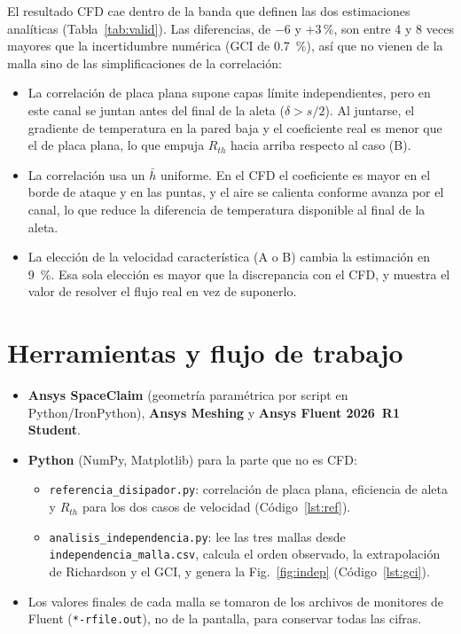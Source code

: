 \documentclass[11pt,letterpaper]{article}
\begin{document}
El resultado CFD cae dentro de la banda que definen las dos estimaciones analíticas (Tabla~\ref{tab:valid}). Las diferencias, de $-6$ y $+3\,\%$, son entre 4 y 8 veces mayores que la incertidumbre numérica (GCI de \SI{0.7}{\%}), así que no vienen de la malla sino de las simplificaciones de la correlación:
\begin{itemize}
\item La correlación de placa plana supone capas límite independientes, pero en este canal se juntan antes del final de la aleta ($\delta>s/2$). Al juntarse, el gradiente de temperatura en la pared baja y el coeficiente real es menor que el de placa plana, lo que empuja $R_{th}$ hacia arriba respecto al caso (B).
\item La correlación usa un $\bar h$ uniforme. En el CFD el coeficiente es mayor en el borde de ataque y en las puntas, y el aire se calienta conforme avanza por el canal, lo que reduce la diferencia de temperatura disponible al final de la aleta.
\item La elección de la velocidad característica (A o B) cambia la estimación en \SI{9}{\%}. Esa sola elección es mayor que la discrepancia con el CFD, y muestra el valor de resolver el flujo real en vez de suponerlo.
\end{itemize}

\section{Herramientas y flujo de trabajo}
\begin{itemize}
\item \textbf{Ansys SpaceClaim} (geometría paramétrica por script en Python/IronPython), \textbf{Ansys Meshing} y \textbf{Ansys Fluent 2026~R1 Student}.
\item \textbf{Python} (NumPy, Matplotlib) para la parte que no es CFD:
  \begin{itemize}
  \item \texttt{referencia\_disipador.py}: correlación de placa plana, eficiencia de aleta y $R_{th}$ para los dos casos de velocidad (Código~\ref{lst:ref}).
  \item \texttt{analisis\_independencia.py}: lee las tres mallas desde \texttt{independencia\_malla.csv}, calcula el orden observado, la extrapolación de Richardson y el GCI, y genera la Fig.~\ref{fig:indep} (Código~\ref{lst:gci}).
  \end{itemize}
\item Los valores finales de cada malla se tomaron de los archivos de monitores de Fluent (\texttt{*-rfile.out}), no de la pantalla, para conservar todas las cifras.
\end{itemize}
\end{document}
